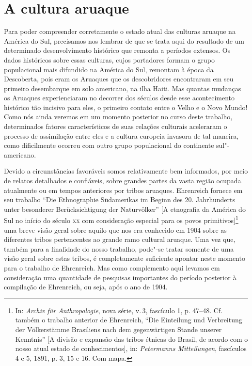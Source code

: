 
\chapter*{A cultura aruaque\smallskip{}}

Para poder compreender corretamente o estado atual das culturas aruaque
na América do Sul, precisamos nos lembrar de que se trata aqui do
resultado de um determinado desenvolvimento histórico que remonta a
períodos extensos. Os dados históricos sobre essas culturas, cujos
portadores formam o grupo populacional mais difundido na América do Sul,
remontam à época da Descoberta, pois eram os Aruaques que os
descobridores encontraram em seu primeiro desembarque em solo americano,
na ilha Haiti. Mas quantas mudanças os Aruaques experienciaram no
decorrer dos séculos desde esse acontecimento histórico tão incisivo
para eles, o primeiro contato entre o Velho e o Novo Mundo! Como nós
ainda veremos em um momento posterior no curso deste trabalho,
determinados fatores característicos de suas relações culturais
aceleraram o processo de assimilação entre eles e a cultura europeia
invasora de tal maneira, como dificilmente ocorreu com outro grupo
populacional do continente sul"-americano.

Devido a circunstâncias favoráveis somos relativamente bem informados,
por meio de relatos detalhados e confiáveis, sobre grandes partes da
vasta região ocupada atualmente ou em tempos anteriores por tribos
aruaques. Ehrenreich fornece em seu trabalho ``Die Ethnographie
Südamerikas im Beginn des 20. Jahrhunderts unter besonderer
Berücksichtigung der Naturvölker'' {[}A etnografia da América do Sul no
início do século \textsc{xx} com consideração especial para os povos
primitivos{]}\footnote{In: \emph{Archiv für Anthropologie}, nova série,
  v.\,3, fascículo 1, p. 47--48. Cf. também o trabalho anterior de
  Ehrenreich, ``Die Einteilung und Verbreitung der Völkerstämme
  Brasiliens nach dem gegenwärtigen Stande unserer Kenntnis'' {[}A
  divisão e expansão das tribos étnicas do Brasil, de acordo com o nosso
  atual estado de conhecimentos{]}, in: \emph{Petermanns Mitteilungen},
  fascículos 4 e 5, 1891, p. 3, 15 e 16. Com mapa.} uma breve visão
geral sobre aquilo que nos era conhecido em 1904 sobre as diferentes
tribos pertencentes ao grande ramo cultural aruaque. Uma vez que, também
para a finalidade do nosso trabalho, pode"-se tratar somente de uma
visão geral sobre estas tribos, é completamente suficiente apontar neste
momento para o trabalho de Ehrenreich. Mas como complemento aqui
levamos em consideração uma quantidade de pesquisas importantes do
período posterior à compilação de Ehrenreich, ou seja, após o ano de
1904.

